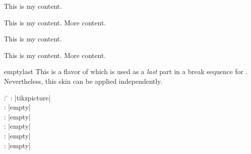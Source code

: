 \begin{dispExample}
\begin{tcbraster}[empty,skin=emptymiddle,raster equal height,raster columns=4,
    coltitle=Navy,borderline={2pt}{0pt}{black!10!white},
    left=1mm,right=1mm,top=1mm,bottom=1mm,middle=1mm]
  \begin{tcolorbox}
    This is my content.
  \end{tcolorbox}
  \begin{tcolorbox}
    This is my content.
    \tcblower
    More content.
  \end{tcolorbox}
  \begin{tcolorbox}[adjusted title=My title]
    This is my content.
  \end{tcolorbox}
  \begin{tcolorbox}[adjusted title=My title]
    This is my content.
    \tcblower
    More content.
  \end{tcolorbox}
\end{tcbraster}
\end{dispExample}


\clearpage
\begin{docSkin}{emptylast}
This is a flavor of  which is used as a \emph{last} part
in a break sequence for .
Nevertheless, this skin can be applied independently.
\begin{tcolorbox}[skintable=emptylast]
  \begin{tabbing}
    : \=\kill
    :  \> |tikzpicture|\\ 
    :           \> |empty|\\
    : \> |empty|\\ 
    :        \> |empty|\\
    :    \> |empty|\\
    :           \> |empty|
  \end{tabbing}
\end{tcolorbox}
\end{docSkin}

